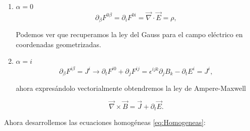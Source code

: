         \begin{enumerate}
            \item $\alpha = 0$ 
            \begin{equation}
                \partial_{\beta}F^{0\beta} = \partial_{i}F^{0i} =  \Vec{\nabla}\cdot\Vec{E} = \rho,
            \end{equation}

            Podemos ver que recuperamos la ley del Gauss para el campo eléctrico en coordenadas geometrizadas.

            \item $\alpha = i$
            \begin{equation}
                \partial_{\beta}F^{i\beta} = J^i \rightarrow \partial_tF^{i0} + \partial_{j}F^{ij} = \epsilon^{ijk}\partial_jB_k - \partial_tE^i = J^i,
            \end{equation}

            ahora expresándolo vectorialmente obtendremos la ley de Ampere-Maxwell

            \begin{equation}
                \Vec{\nabla}\times\Vec{B} = \Vec{J} + \partial_t\Vec{E}.
            \end{equation}
        \end{enumerate}

        Ahora desarrollemos las ecuaciones homogéneas \ref{eq:Homogeneas}:

